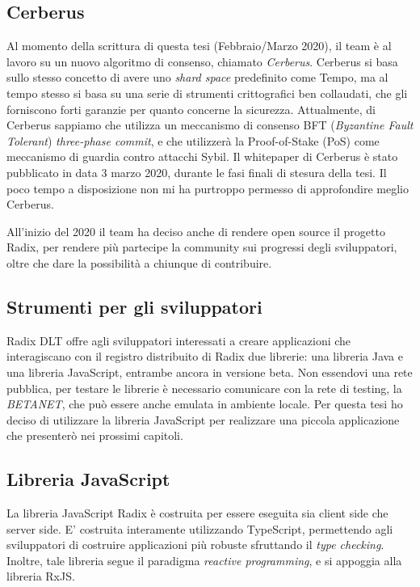 \subsection{Cerberus}

Al momento della scrittura di questa tesi (Febbraio/Marzo 2020), il team è al lavoro su un nuovo algoritmo di consenso, chiamato \textit{Cerberus}. Cerberus si basa sullo stesso concetto di avere uno \textit{shard space} predefinito come Tempo, ma al tempo stesso si basa su una serie di strumenti crittografici ben collaudati, che gli forniscono forti garanzie per quanto concerne la sicurezza. Attualmente, di Cerberus sappiamo che utilizza un meccanismo di consenso BFT (\textit{Byzantine Fault Tolerant}) \textit{three-phase commit}, e che utilizzerà la Proof-of-Stake (PoS) come meccanismo di guardia contro attacchi Sybil. Il whitepaper di Cerberus è stato pubblicato in data 3 marzo 2020, durante le fasi finali di stesura della tesi. Il poco tempo a disposizione non mi ha purtroppo permesso di approfondire meglio Cerberus.

All'inizio del 2020 il team ha deciso anche di rendere open source il progetto Radix, per rendere più partecipe la community sui progressi degli sviluppatori, oltre che dare la possibilità a chiunque di contribuire.

\subsection{Strumenti per gli sviluppatori}

Radix DLT offre agli sviluppatori interessati a creare applicazioni che interagiscano con il registro distribuito di Radix due librerie: una libreria Java e una libreria JavaScript, entrambe ancora in versione beta. Non essendovi una rete pubblica, per testare le librerie è necessario comunicare con la rete di testing, la \textit{BETANET}, che può essere anche emulata in ambiente locale. Per questa tesi ho deciso di utilizzare la libreria JavaScript per realizzare una piccola applicazione che presenterò nei prossimi capitoli.

\subsection{Libreria JavaScript}

La libreria JavaScript Radix è costruita per essere eseguita sia client side che server side. E' costruita interamente utilizzando TypeScript, permettendo agli sviluppatori di costruire applicazioni più robuste sfruttando il \textit{type checking}. Inoltre, tale libreria segue il paradigma \textit{reactive programming}, e si appoggia alla libreria RxJS.

